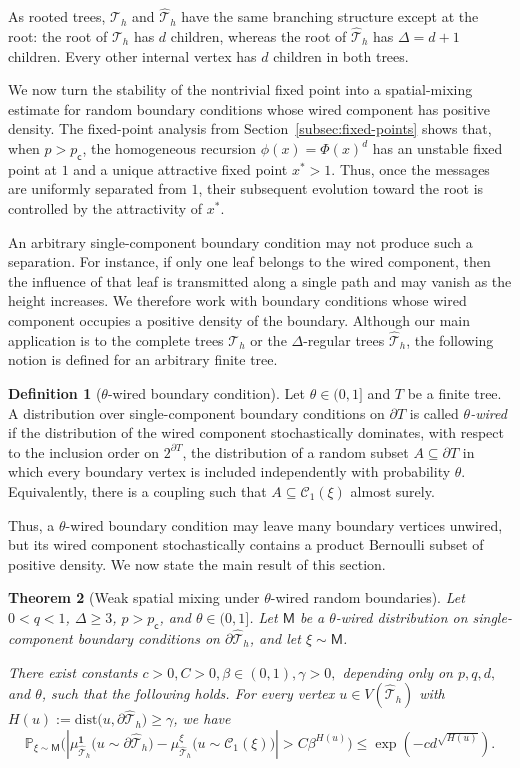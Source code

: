 \documentclass[11pt]{amsart}
\theoremstyle{plain}
\newtheorem{theorem}{Theorem}[section]
\theoremstyle{definition}
\newtheorem{definition}[theorem]{Definition}
\theoremstyle{remark}
\newcommand{\dary}{\mathcal T_h}
\newcommand{\dreg}{\widehat {\mathcal T}_h}
\newcommand{\pc}{p_{\mathsf{c}}}
\newcommand{\dist}{\mathrm{dist}}
\begin{document}
As rooted trees, $\dary$ and $\dreg$ have the same branching structure except at the root: the root of $\dary$ has $d$ children, whereas the root of $\dreg$ has $\Delta=d+1$ children. Every other internal vertex has $d$ children in both trees.

We now turn the stability of the nontrivial fixed point into a spatial-mixing estimate for random boundary conditions whose wired component has positive density.
The fixed-point analysis from Section~\ref{subsec:fixed-points} shows that, when $p>\pc$, the homogeneous recursion $\phi(x)=\Phi(x)^d$ has an unstable fixed point at $1$ and a unique attractive fixed point $x^*>1$. Thus, once the messages are uniformly separated from $1$, their subsequent evolution toward the root is controlled by the attractivity of $x^*$.

An arbitrary single-component boundary condition may not produce such a separation. For instance, if only one leaf belongs to the wired component, then the influence of that leaf is transmitted along a single path and may vanish as the height increases. We therefore work with boundary conditions whose wired component occupies a positive density of the boundary. Although our main application is to the complete trees $\dary$ or the $\Delta$-regular trees $\dreg$, the following notion is defined for an arbitrary finite tree.

\begin{definition}[$\theta$-wired boundary condition]
\label{def:theta-wired}
Let $\theta\in(0,1]$ and $T$ be a finite tree. A distribution over single-component boundary conditions on $\partial T$ is called \emph{$\theta$-wired} if the distribution of the wired component stochastically dominates, with respect to the inclusion order on $2^{\partial T}$, the distribution of a random subset $A\subseteq\partial T$ in which every boundary vertex is included independently with probability $\theta$. Equivalently, there is a coupling such that $A\subseteq\mathcal C_1(\xi)$ almost surely.
\end{definition}

Thus, a $\theta$-wired boundary condition may leave many boundary vertices unwired, but its wired component stochastically contains a product Bernoulli subset of positive density. We now state the main result of this section.

\begin{theorem}[Weak spatial mixing under $\theta$-wired random boundaries]
\label{thm:wsm}
Let $0<q<1$, $\Delta\ge3$, $p>\pc$, and $\theta\in(0,1]$. Let $\mathsf M$ be a $\theta$-wired distribution on single-component boundary conditions on $\partial \dreg$, and let $\xi\sim\mathsf M$.

There exist constants $c>0, C>0, \beta\in(0,1), \gamma>0,$ depending only on $p,q,d,$ and $\theta$, such that the following holds. For every vertex $u\in V(\dreg)$ with $H(u):=\dist\bigl(u,\partial \dreg\bigr)\ge\gamma$, we have 
\[
\mathbb P_{\xi\sim\mathsf M}\Bigg(
\left|
    \mu_{\dreg}^{\mathbf 1}
    \bigl(u\sim\partial \dreg\bigr)
    -
    \mu_{\dreg}^{\xi}
    \bigl(u\sim\mathcal C_1(\xi)\bigr)
\right|
>
C\beta^{H(u)}
\Bigg)
\le
\exp\left(-c d^{\sqrt{H(u)}}\right).
\]
\end{theorem}
\end{document}
